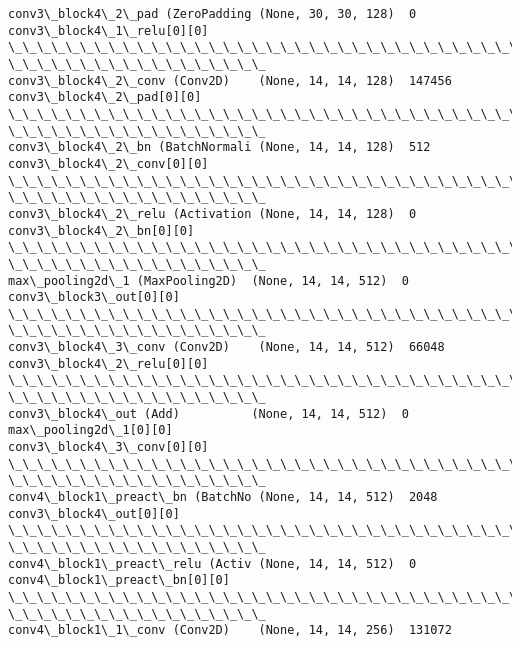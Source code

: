 \documentclass[11pt]{article}
\begin{document}
\begin{Verbatim}[commandchars=\\\{\}]
conv3\_block4\_2\_pad (ZeroPadding (None, 30, 30, 128)  0
conv3\_block4\_1\_relu[0][0]
\_\_\_\_\_\_\_\_\_\_\_\_\_\_\_\_\_\_\_\_\_\_\_\_\_\_\_\_\_\_\_\_\_\_\_\_\_\_\_\_\_\_\_\_\_\_\_\_\_\_\_\_\_\_\_\_\_\_\_\_\_\_\_\_\_\_\_\_\_\_\_\_\_\_\_\_\_\_\_\_
\_\_\_\_\_\_\_\_\_\_\_\_\_\_\_\_\_\_
conv3\_block4\_2\_conv (Conv2D)    (None, 14, 14, 128)  147456
conv3\_block4\_2\_pad[0][0]
\_\_\_\_\_\_\_\_\_\_\_\_\_\_\_\_\_\_\_\_\_\_\_\_\_\_\_\_\_\_\_\_\_\_\_\_\_\_\_\_\_\_\_\_\_\_\_\_\_\_\_\_\_\_\_\_\_\_\_\_\_\_\_\_\_\_\_\_\_\_\_\_\_\_\_\_\_\_\_\_
\_\_\_\_\_\_\_\_\_\_\_\_\_\_\_\_\_\_
conv3\_block4\_2\_bn (BatchNormali (None, 14, 14, 128)  512
conv3\_block4\_2\_conv[0][0]
\_\_\_\_\_\_\_\_\_\_\_\_\_\_\_\_\_\_\_\_\_\_\_\_\_\_\_\_\_\_\_\_\_\_\_\_\_\_\_\_\_\_\_\_\_\_\_\_\_\_\_\_\_\_\_\_\_\_\_\_\_\_\_\_\_\_\_\_\_\_\_\_\_\_\_\_\_\_\_\_
\_\_\_\_\_\_\_\_\_\_\_\_\_\_\_\_\_\_
conv3\_block4\_2\_relu (Activation (None, 14, 14, 128)  0
conv3\_block4\_2\_bn[0][0]
\_\_\_\_\_\_\_\_\_\_\_\_\_\_\_\_\_\_\_\_\_\_\_\_\_\_\_\_\_\_\_\_\_\_\_\_\_\_\_\_\_\_\_\_\_\_\_\_\_\_\_\_\_\_\_\_\_\_\_\_\_\_\_\_\_\_\_\_\_\_\_\_\_\_\_\_\_\_\_\_
\_\_\_\_\_\_\_\_\_\_\_\_\_\_\_\_\_\_
max\_pooling2d\_1 (MaxPooling2D)  (None, 14, 14, 512)  0
conv3\_block3\_out[0][0]
\_\_\_\_\_\_\_\_\_\_\_\_\_\_\_\_\_\_\_\_\_\_\_\_\_\_\_\_\_\_\_\_\_\_\_\_\_\_\_\_\_\_\_\_\_\_\_\_\_\_\_\_\_\_\_\_\_\_\_\_\_\_\_\_\_\_\_\_\_\_\_\_\_\_\_\_\_\_\_\_
\_\_\_\_\_\_\_\_\_\_\_\_\_\_\_\_\_\_
conv3\_block4\_3\_conv (Conv2D)    (None, 14, 14, 512)  66048
conv3\_block4\_2\_relu[0][0]
\_\_\_\_\_\_\_\_\_\_\_\_\_\_\_\_\_\_\_\_\_\_\_\_\_\_\_\_\_\_\_\_\_\_\_\_\_\_\_\_\_\_\_\_\_\_\_\_\_\_\_\_\_\_\_\_\_\_\_\_\_\_\_\_\_\_\_\_\_\_\_\_\_\_\_\_\_\_\_\_
\_\_\_\_\_\_\_\_\_\_\_\_\_\_\_\_\_\_
conv3\_block4\_out (Add)          (None, 14, 14, 512)  0
max\_pooling2d\_1[0][0]
conv3\_block4\_3\_conv[0][0]
\_\_\_\_\_\_\_\_\_\_\_\_\_\_\_\_\_\_\_\_\_\_\_\_\_\_\_\_\_\_\_\_\_\_\_\_\_\_\_\_\_\_\_\_\_\_\_\_\_\_\_\_\_\_\_\_\_\_\_\_\_\_\_\_\_\_\_\_\_\_\_\_\_\_\_\_\_\_\_\_
\_\_\_\_\_\_\_\_\_\_\_\_\_\_\_\_\_\_
conv4\_block1\_preact\_bn (BatchNo (None, 14, 14, 512)  2048
conv3\_block4\_out[0][0]
\_\_\_\_\_\_\_\_\_\_\_\_\_\_\_\_\_\_\_\_\_\_\_\_\_\_\_\_\_\_\_\_\_\_\_\_\_\_\_\_\_\_\_\_\_\_\_\_\_\_\_\_\_\_\_\_\_\_\_\_\_\_\_\_\_\_\_\_\_\_\_\_\_\_\_\_\_\_\_\_
\_\_\_\_\_\_\_\_\_\_\_\_\_\_\_\_\_\_
conv4\_block1\_preact\_relu (Activ (None, 14, 14, 512)  0
conv4\_block1\_preact\_bn[0][0]
\_\_\_\_\_\_\_\_\_\_\_\_\_\_\_\_\_\_\_\_\_\_\_\_\_\_\_\_\_\_\_\_\_\_\_\_\_\_\_\_\_\_\_\_\_\_\_\_\_\_\_\_\_\_\_\_\_\_\_\_\_\_\_\_\_\_\_\_\_\_\_\_\_\_\_\_\_\_\_\_
\_\_\_\_\_\_\_\_\_\_\_\_\_\_\_\_\_\_
conv4\_block1\_1\_conv (Conv2D)    (None, 14, 14, 256)  131072

\end{Verbatim}
\end{document}
